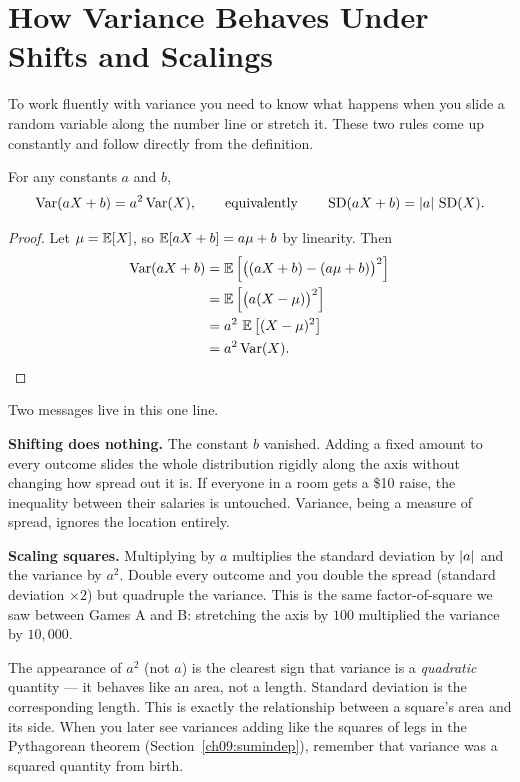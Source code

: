 \section{How Variance Behaves Under Shifts and Scalings}
\label{ch09:affine}

To work fluently with variance you need to know what happens when you slide a
random variable along the number line or stretch it. These two rules come up
constantly and follow directly from the definition.

\begin{proposition}
\label{ch09:prop-affine}
For any constants $a$ and $b$,
\[
  \operatorname{Var}(aX + b) = a^2 \operatorname{Var}(X),
  \qquad\text{equivalently}\qquad
  \operatorname{SD}(aX+b) = \lvert a\rvert\,\operatorname{SD}(X).
\]
\end{proposition}

\begin{proof}
Let $\mu = \operatorname{\mathbb{E}}[X]$, so $\operatorname{\mathbb{E}}[aX+b] = a\mu + b$ by linearity. Then
\begin{align*}
  \operatorname{Var}(aX+b) &= \operatorname{\mathbb{E}}\Big[\big((aX+b) - (a\mu+b)\big)^2\Big] \\
  &= \operatorname{\mathbb{E}}\Big[\big(a(X-\mu)\big)^2\Big] \\
  &= a^2\,\operatorname{\mathbb{E}}\big[(X-\mu)^2\big] \\
  &= a^2\operatorname{Var}(X). \qedhere
\end{align*}
\end{proof}

Two messages live in this one line.

\textbf{Shifting does nothing.} The constant $b$ vanished. Adding a fixed
amount to every outcome slides the whole distribution rigidly along the axis
without changing how spread out it is. If everyone in a room gets a \$10
raise, the inequality between their salaries is untouched. Variance, being a
measure of spread, ignores the location entirely.

\textbf{Scaling squares.} Multiplying by $a$ multiplies the standard
deviation by $\lvert a\rvert$ and the variance by $a^2$. Double every outcome and you
double the spread (standard deviation $\times 2$) but quadruple the variance.
This is the same factor-of-square we saw between Games A and B: stretching the
axis by $100$ multiplied the variance by $10{,}000$.

\begin{happeningbox}
The appearance of $a^2$ (not $a$) is the clearest sign that variance is a
\emph{quadratic} quantity --- it behaves like an area, not a length. Standard
deviation is the corresponding length. This is exactly the relationship
between a square's area and its side. When you later see variances adding like
the squares of legs in the Pythagorean theorem
(Section~\ref{ch09:sumindep}), remember that variance was a squared quantity
from birth.
\end{happeningbox}

